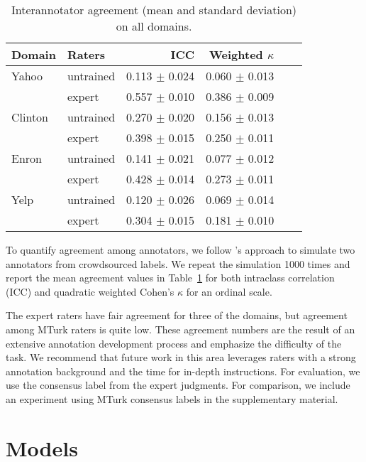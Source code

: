 \documentclass[11pt,a4paper]{article}
\begin{document}
\begin{table}[htb]
\small
\begin{center}
\begin{tabular}{llrrrr}
\toprule
Domain & Raters & ICC & Weighted $\kappa$ \\
\midrule
Yahoo & untrained & 0.113 $\pm$ 0.024 & 0.060 $\pm$ 0.013 \\
	  & expert & 0.557 $\pm$ 0.010 & 0.386 $\pm$ 0.009 \\
Clinton & untrained & 0.270 $\pm$ 0.020 & 0.156 $\pm$ 0.013 \\
		& expert & 0.398 $\pm$ 0.015 & 0.250 $\pm$ 0.011 \\
Enron	& untrained & 0.141 $\pm$ 0.021 & 0.077 $\pm$ 0.012 \\
		& expert & 0.428 $\pm$ 0.014 & 0.273 $\pm$ 0.011 \\
Yelp 	& untrained & 0.120 $\pm$ 0.026 & 0.069 $\pm$ 0.014 \\
		& expert & 0.304 $\pm$ 0.015 & 0.181 $\pm$ 0.010 \\
\bottomrule
\end{tabular}
\caption{Interannotator agreement (mean and standard deviation) on all domains.}
\label{tab:agreement}
\end{center}
\end{table}

To quantify agreement among annotators, we follow \citet{pavlick_TACL16}'s approach to simulate two annotators from crowdsourced labels. We repeat the simulation 1000 times and report the mean agreement values in Table~\ref{tab:agreement} for both intraclass correlation (ICC) and quadratic weighted Cohen's $\kappa$ for an ordinal scale.

The expert raters have fair agreement \cite{landis} for three of the domains, but agreement among MTurk raters is quite low.
These agreement numbers are the result of an extensive annotation development process and emphasize the difficulty of the task. We recommend that future work in this area leverages raters with a strong annotation background and the time for in-depth instructions. For evaluation, we use the consensus label from the expert judgments. For comparison, we include an experiment using MTurk consensus labels in the supplementary material.  




\section{Models}
\label{sec:models}
\end{document}
